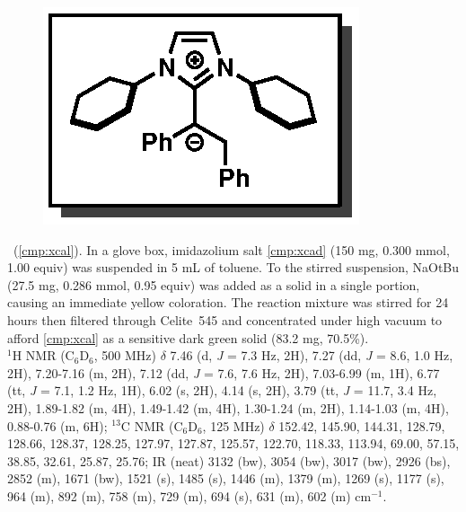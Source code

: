 \vspace{10pt}
\begin{figure}
  \vspace{-33pt}
  \begin{center}
    \includegraphics[scale=0.8]{chp_alkylation/images/xcal}
  \end{center}
  \vspace{-30pt}
\end{figure}
\noindent \textbf{\CMPxcal}\ (\ref{cmp:xcal}). In a glove box, imidazolium salt \ref{cmp:xcad}
(150 mg, 0.300 mmol, 1.00 equiv) was suspended in 5 mL of toluene. To the stirred suspension, NaOtBu
(27.5 mg, 0.286 mmol, 0.95 equiv) was added as a solid in a single portion, causing an immediate
yellow coloration.
The reaction mixture was stirred for 24 hours then filtered through Celite\regtm\  545 and concentrated under high vacuum
to afford \ref{cmp:xcal} as a sensitive dark green solid (83.2 mg, 70.5\%).
\\
$^1$H NMR (C$_6$D$_6$, 500 MHz) $\delta$ 7.46 (d, \textit{J} = 7.3 Hz, 2H), 7.27 (dd, \textit{J} =
8.6, 1.0 Hz, 2H), 7.20-7.16 (m, 2H), 7.12 (dd, \textit{J} = 7.6, 7.6 Hz, 2H), 7.03-6.99 (m, 1H),
6.77 (tt, \textit{J} = 7.1, 1.2 Hz, 1H), 6.02 (s, 2H), 4.14 (s, 2H), 3.79 (tt, \textit{J} = 11.7,
3.4 Hz, 2H), 1.89-1.82 (m, 4H), 1.49-1.42 (m, 4H), 1.30-1.24 (m, 2H), 1.14-1.03 (m, 4H), 0.88-0.76
(m, 6H); $^{13}$C NMR (C$_6$D$_6$, 125 MHz) $\delta$ 152.42, 145.90, 144.31, 128.79, 128.66, 128.37,
128.25, 127.97, 127.87, 125.57, 122.70, 118.33, 113.94, 69.00, 57.15, 38.85, 32.61, 25.87, 25.76; IR
(neat)  3132 (bw), 3054 (bw), 3017 (bw), 2926 (bs), 2852 (m), 1671 (bw), 1521 (s), 1485
(s), 1446 (m), 1379 (m), 1269 (s), 1177 (s), 964 (m), 892 (m), 758 (m), 729 (m), 694 (s),
631 (m), 602 (m) cm$^{-1}$.

